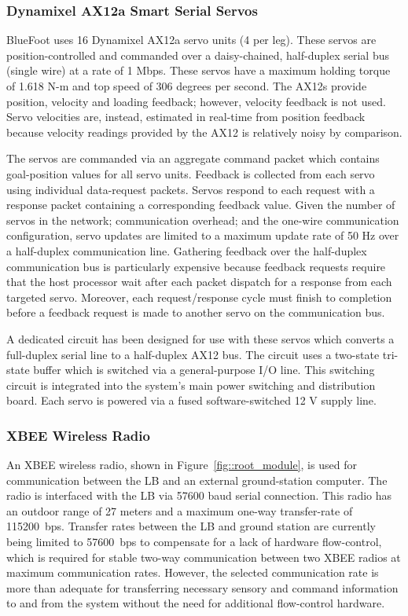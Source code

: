 			\subsubsection{Dynamixel AX12a Smart Serial Servos}

				BlueFoot uses 16 Dynamixel AX12a servo units (4 per leg). These servos are position-controlled and commanded over a daisy-chained, half-duplex serial bus (\IE single wire) at a rate of 1 Mbps. These servos have a maximum holding torque of 1.618 N-m and top speed of 306 degrees per second. The AX12s provide position, velocity and loading feedback; however, velocity feedback is not used. Servo velocities are, instead, estimated in real-time from position feedback because velocity readings provided by the AX12 is relatively noisy by comparison. 

				The servos are commanded via an aggregate command packet which contains goal-position values for all servo units. Feedback is collected from each servo using individual data-request packets. Servos respond to each request with a response packet containing a corresponding feedback value. Given the number of servos in the network; communication overhead; and the one-wire communication configuration, servo updates are limited to a maximum update rate of 50 Hz over a half-duplex communication line. Gathering feedback over the half-duplex communication bus is particularly expensive because feedback requests require that the host processor wait after each packet dispatch for a response from each targeted servo. Moreover, each request/response cycle must finish to completion before a feedback request is made to another servo on the communication bus.

				A dedicated circuit has been designed for use with these servos which converts a full-duplex serial line to a half-duplex AX12 bus. The circuit uses a two-state tri-state buffer which is switched via a general-purpose I/O line. This switching circuit is integrated into the system's main power switching and distribution board. Each servo is powered via a fused software-switched 12 V supply line.

			\subsubsection{XBEE Wireless Radio}

				An XBEE wireless radio, shown in Figure~\ref{fig::root_module}, is used for communication between the LB and an external ground-station computer. The radio is interfaced with the LB via 57600 baud serial connection. This radio has an outdoor range of 27 meters and a maximum one-way transfer-rate of 115200~bps. Transfer rates between the LB and ground station are currently being limited to 57600~bps to compensate for a lack of hardware flow-control, which is required for stable two-way communication between two XBEE radios at maximum communication rates. However, the selected communication rate is more than adequate for transferring necessary sensory and command information to and from the system without the need for additional flow-control hardware.

